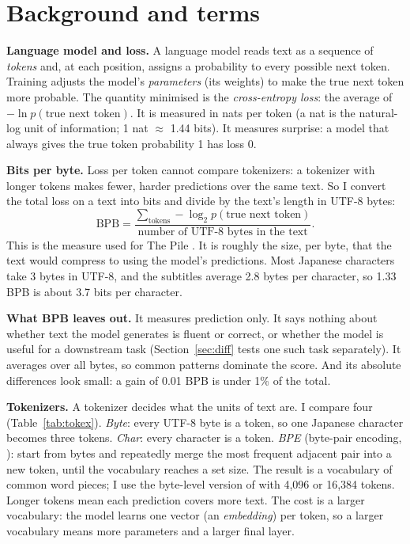 \documentclass[11pt]{article}
\begin{document}
\section{Background and terms}

\textbf{Language model and loss.} A language model reads text as a sequence of
\emph{tokens} and, at each position, assigns a probability to every possible
next token. Training adjusts the model's \emph{parameters} (its weights) to make
the true next token more probable. The quantity minimised is the \emph{cross-entropy loss}: the average of
$-\ln p(\text{true next token})$. It is measured in nats per token (a nat is the
natural-log unit of information; 1 nat $\approx$ 1.44 bits). It measures
surprise: a model that always gives the true token probability 1 has loss 0.

\textbf{Bits per byte.}\label{sec:bpb} Loss per token cannot compare tokenizers:
a tokenizer with longer tokens makes fewer, harder predictions over the same
text. So I convert the total loss on a text into bits and divide by the text's
length in UTF-8 bytes:
\[
\text{BPB} = \frac{\sum_{\text{tokens}} -\log_2 p(\text{true next token})}{\text{number of UTF-8 bytes in the text}} .
\]
This is the measure used for The Pile \citep{gao2020pile}. It is roughly the size, per byte, that the text would compress to using the
model's predictions. Most Japanese characters take 3 bytes in UTF-8, and the
subtitles average 2.8 bytes per character, so 1.33 BPB is about 3.7 bits per
character.

\textbf{What BPB leaves out.} It measures prediction only. It says nothing about
whether text the model generates is fluent or correct, or whether the model is
useful for a downstream task (Section~\ref{sec:diff} tests one such task
separately). It averages over all bytes, so common patterns dominate the score.
And its absolute differences look small: a gain of 0.01 BPB is under 1\% of the
total.

\textbf{Tokenizers.} A tokenizer decides what the units of text are. I compare
four (Table~\ref{tab:tokex}). \emph{Byte}: every UTF-8 byte is a token, so one
Japanese character becomes three tokens. \emph{Char}: every character is a
token. \emph{BPE} (byte-pair encoding, \citealp{sennrich2016bpe}): start from
bytes and repeatedly merge the most frequent adjacent pair into a new token,
until the vocabulary reaches a set size. The result is a vocabulary of common
word pieces; I use the byte-level version of \citet{radford2019gpt2} with 4{,}096
or 16{,}384 tokens. Longer tokens mean each prediction covers more text. The cost is a larger
vocabulary: the model learns one vector (an \emph{embedding}) per token, so a
larger vocabulary means more parameters and a larger final layer.
\end{document}
